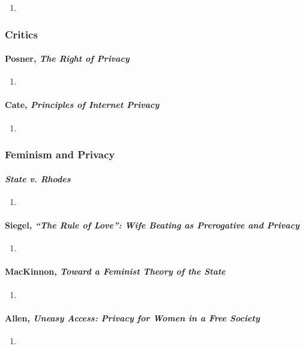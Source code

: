 \begin{enumerate}
    \item %
\end{enumerate}

\subsubsection{Critics}

\paragraph{Posner, \emph{The Right of Privacy}}

\begin{enumerate}
    \item %
\end{enumerate}

\paragraph{Cate, \emph{Principles of Internet Privacy}}

\begin{enumerate}
    \item %
\end{enumerate}

\subsubsection{Feminism and Privacy}

\paragraph{\emph{State v. Rhodes}}

\begin{enumerate}
    \item %
\end{enumerate}

\paragraph{Siegel, \emph{``The Rule of Love'': Wife Beating as Prerogative and 
Privacy}}

\begin{enumerate}
    \item %
\end{enumerate}

\paragraph{MacKinnon, \emph{Toward a Feminist Theory of the State}}

\begin{enumerate}
    \item %
\end{enumerate}

\paragraph{Allen, \emph{Uneasy Access: Privacy for Women in a Free Society}}

\begin{enumerate}
    \item %
\end{enumerate}
